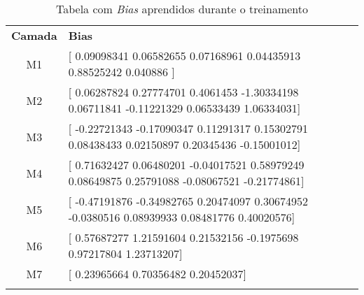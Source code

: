 \begin{table}
	\center
	\caption{Tabela com \emph{Bias} aprendidos durante o treinamento}
	\renewcommand{\arraystretch}{1.6}
	\begin{tabular}{c p{8.0cm}}
		\Xhline{6\arrayrulewidth}
		\textbf{Camada} &
			\textbf{Bias} \\
		\Xhline{2\arrayrulewidth}
		M1 & [
			0.09098341  0.06582655 0.07168961  0.04435913  0.88525242
			 0.040886  ] \\
		M2 & [
			0.06287824  0.27774701 0.4061453  -1.30334198 0.06711841
			-0.11221329 0.06533439  1.06334031] \\
		M3 & [
			-0.22721343 -0.17090347 0.11291317 0.15302791 0.08438433
			0.02150897 0.20345436 -0.15001012] \\ 
		M4 & [
			0.71632427 0.06480201 -0.04017521 0.58979249 0.08649875
			0.25791088 -0.08067521 -0.21774861] \\
		M5 & [
			-0.47191876 -0.34982765 0.20474097 0.30674952 -0.0380516
			0.08939933 0.08481776 0.40020576] \\
		M6 & [
			0.57687277 1.21591604 0.21532156 -0.1975698 0.97217804
			1.23713207] \\
		M7 & [
			0.23965664 0.70356482 0.20452037] \\
		
		\Xhline{6\arrayrulewidth}
	\end{tabular}
	\label{tbl:player_fps}
\end{table}

